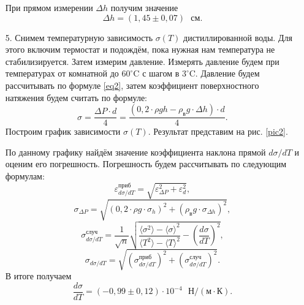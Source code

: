 \documentclass[a4paper, 12pt]{article}
\begin{document}
\begin{enumerate}
        При прямом измерении $\Delta h$ получим значение
        \begin{equation}
            \Delta h = (1,45 \pm 0,07) \text{ } см.
        \end{equation}
        
        \item[5.] Снимем температурную зависимость $\sigma (T)$ дистиллированной воды. Для этого включим термостат и подождём, пока нужная нам температура не стабилизируется. Затем измерим давление. Измерять давление будем при температурах от комнатной до $60^{\circ} \text{C}$ с шагом в $3^\circ \text{C}$. Давление будем рассчитывать по формуле \eqref{eq2}, затем коэффициент поверхностного натяжения будем считать по формуле:
        \begin{equation}
            \sigma = \frac{\Delta P \cdot d}{4} = \frac{(0,2 \cdot \rho g h - \rho_в g \cdot \Delta h) \cdot d}{4}.
        \end{equation}
        Построим график зависимости $\sigma (T)$. Результат представим на рис. \ref{pic2}.
        
        По данному графику найдём значение коэффициента наклона прямой $d \sigma/d T$ и оценим его погрешность. Погрешность будем рассчитывать по следующим формулам:
        \begin{equation}
            \varepsilon_{d\sigma/dT}^{приб} = \sqrt{\varepsilon_{\Delta P}^2 + \varepsilon_d^2},
        \end{equation}
        \begin{equation}
            \sigma_{\Delta P} = \sqrt{(0,2 \cdot \rho g \cdot \sigma_h)^2 + (\rho_в g \cdot \sigma_{\Delta h})^2},
        \end{equation}
        \begin{equation}
            \sigma_{d\sigma/dT}^{случ} = \frac{1}{\sqrt{n}} \sqrt{\frac{\langle \sigma^2 \rangle - \langle \sigma \rangle^2}{\langle T^2 \rangle - \langle T \rangle^2} - \left( \frac{d\sigma}{dT} \right)^2},
        \end{equation}
        \begin{equation}
            \sigma_{d\sigma/dT} = \sqrt{(\sigma_{d\sigma/dT}^{приб})^2 + (\sigma_{d\sigma/dT}^{случ})^2}.
        \end{equation}
        В итоге получаем
        \begin{equation}
            \frac{d\sigma}{dT} = (-0,99 \pm 0,12) \cdot 10^{-4} \text{ } Н/(м \cdot К).
        \end{equation}
        

\end{enumerate}
\end{document}
